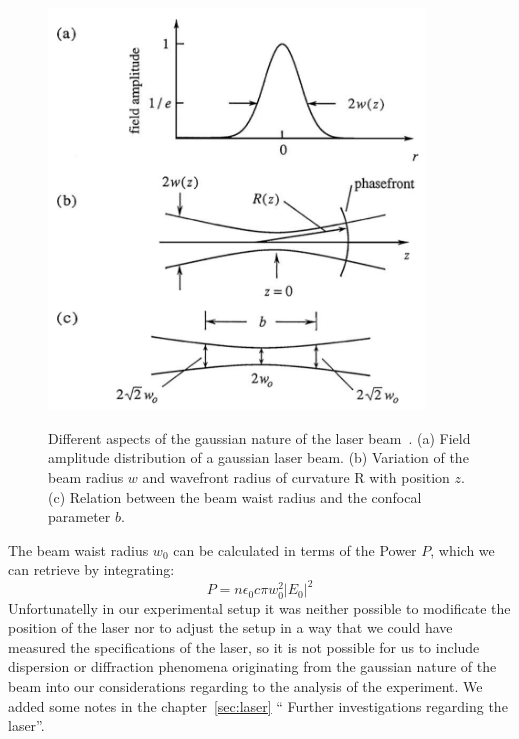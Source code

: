 \begin{figure}
    \begin{centering}
    \caption{Different aspects of the gaussian nature of the laser beam~\cite{boyd2003nonlinear}.
        (a) Field amplitude distribution of a gaussian laser beam. (b) Variation of the beam
        radius $w$ and wavefront radius of curvature R with position $z$.
        (c) Relation between the beam waist radius and the confocal parameter $b$. }
        \includegraphics[width=10cm]{figures/gaussian}
        \label{fig:integral}
    \end{centering}
\end{figure}
The beam waist radius $w_{0}$ can be calculated in terms of the Power $P$, which we can retrieve
by integrating:
\begin{equation}
    P = n \epsilon_0 c \pi w_0^2 |E_0|^2
\end{equation}
Unfortunatelly in our experimental setup it was neither possible to modificate the position of
the laser nor to adjust the setup in a way that we could have measured the specifications of 
the laser, so it is not possible for us to include dispersion or diffraction phenomena originating
from the gaussian nature of the beam into our considerations regarding to the analysis of the 
experiment. We added some notes in the chapter~\ref{sec:laser} ``
Further investigations regarding the laser''.

